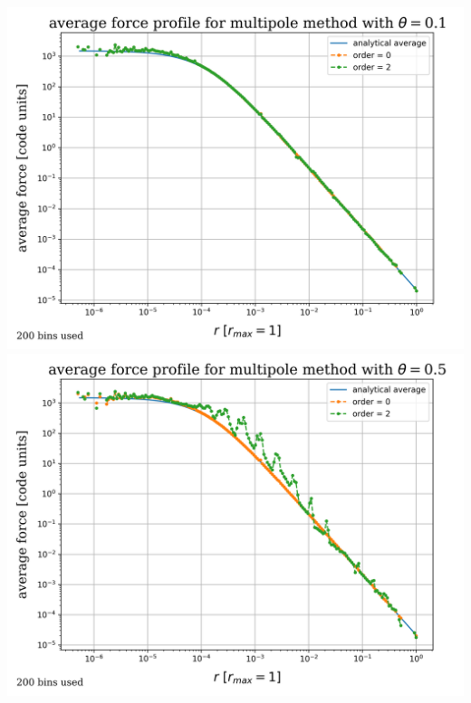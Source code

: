 \begin{frame}
	\begin{columns}
			\includegraphics[width=\textwidth]{../results/multipole_forces/bucket01/0.1/multipole_forces_plot-0.1.png}\\[2em]
			\includegraphics[width=\textwidth]{../results/multipole_forces/bucket01/0.5/multipole_forces_plot-0.5.png}

\end{columns}
\end{frame}
